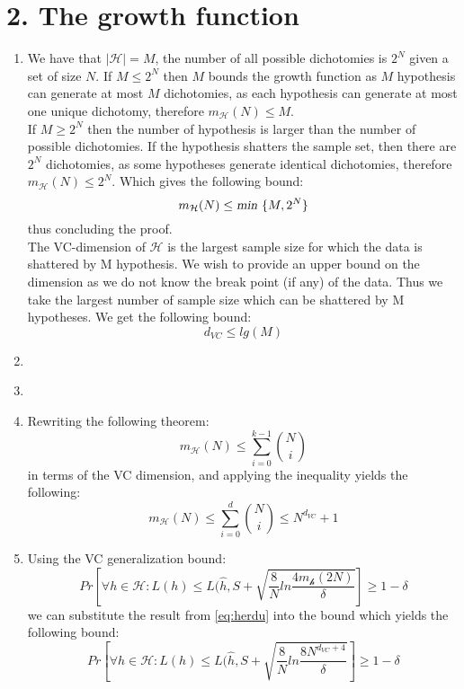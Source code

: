 \documentclass{article}
\begin{document}
\section{2. The growth function}
\begin{enumerate}
\item{
We have that $|\mathcal{H}| = M$, the number of all possible dichotomies is $2^N$ given a set of size $N$. If $M \leq 2^N$ then $M$ bounds the growth function as $M$ hypothesis can generate at most $M$ dichotomies, as each hypothesis can generate at most one unique dichotomy, therefore $m_{\mathcal{H}}(N) \leq M$. \\
If $M \geq 2^N $ then the number of hypothesis is larger than the number of possible dichotomies. If the hypothesis shatters the sample set, then there are $2^N$ dichotomies, as some hypotheses generate identical dichotomies, therefore  $m_{\mathcal{H}}(N) \leq 2^N$. Which gives the following bound:
\begin{equation}
m_{\mathcal{H}}(N) \leq \textsl{min } \lbrace M,2^N \rbrace
\end{equation}
thus concluding the proof. \\
The VC-dimension of $\mathcal{H}$ is the largest sample size for which the data is shattered by M hypothesis. We wish to provide an upper bound on the dimension as we do not know the break point (if any) of the data. Thus we take the largest number of sample size which can be shattered by M hypotheses. We get the following bound:
\begin{equation}
d_{VC} \leq lg(M)
\end{equation}
}
\item{
}
\item{ }
\item{
Rewriting the following theorem:
\begin{equation}
m_\mathcal{H}(N) \leq \sum \limits_{i=0}^{k-1}\binom{N}{i} 
\end{equation}
in terms of the VC dimension, and applying the inequality yields the following:
\begin{equation}
m_\mathcal{H}(N) \leq \sum \limits_{i=0}^{d}\binom{N}{i} \leq N^{d_{VC}}+1 
\label{eq:herdu}
\end{equation}
}
\item{
Using the VC generalization bound:
\begin{equation}
Pr \left[ \forall h \in \mathcal{H}: L(h) \leq L(\hat{h},S+
\sqrt{\dfrac{8}{N} ln \dfrac{4m_\mathcal{h}(2N)}{\delta}} \right] \geq 1 - \delta 
\end{equation}
we can substitute the result from \eqref{eq:herdu} into the bound which yields the following bound: 
\begin{equation}
Pr \left[ \forall h \in \mathcal{H}: L(h) \leq L(\hat{h},S+
\sqrt{\dfrac{8}{N} ln \dfrac{8N^{d_{VC}+4}}{\delta}} \right] \geq 1 - \delta 
\end{equation}
}
\end{enumerate}
\end{document}
